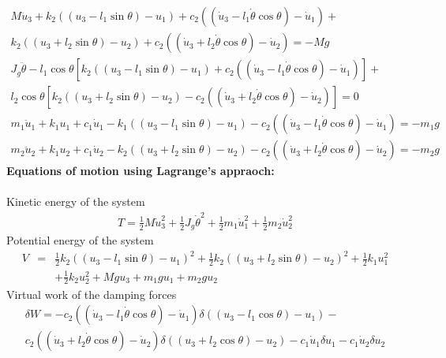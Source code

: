 \documentclass[]{report}
\begin{document}
\begin{eqnarray}
M \ddot{u}_3+k_2\left(\left(u_3-l_1 \sin{\theta}\right) -u_1\right)+c_2\left(\left(\dot{u}_3 -l_1 \dot{\theta} \cos{\theta}\right)-\dot{u}_1\right)+\nonumber\\
k_2\left(\left(u_3+l_2 \sin{\theta}\right) -u_2\right)+c_2\left(\left(\dot{u}_3 +l_2 \dot{\theta} \cos{\theta}\right)-\dot{u}_2\right)=-Mg\\
J_g \ddot{\theta}-l_1 \cos{\theta} \left[ k_2\left(\left(u_3-l_1 \sin{\theta}\right) -u_1\right)+c_2\left(\left(\dot{u}_3 -l_1 \dot{\theta} \cos{\theta}\right)-\dot{u}_1 \right) \right]+\nonumber\\
l_2 \cos{\theta} \left[k_2\left(\left(u_3+l_2 \sin{\theta}\right) -u_2\right)-c_2\left(\left(\dot{u}_3 +l_2 \dot{\theta} \cos{\theta}\right)-\dot{u}_2\right)\right]=0\\
 m_1 \ddot{u}_1+k_1 u_1 +c_1\dot{u}_1-k_1\left(\left(u_3-l_1\sin{\theta}\right)-u_1\right)-c_2\left(\left(\dot{u}_3 -l_1 \dot{\theta} \cos{\theta}\right)-\dot{u}_1 \right)=-m_1g\\
m_2 \ddot{u}_2+k_1 u_2 +c_1\dot{u}_2-k_2\left(\left(u_3+l_2\sin{\theta}\right)-u_2\right)-c_2\left(\left(\dot{u}_3 +l_2 \dot{\theta} \cos{\theta}\right)-\dot{u}_2 \right)=-m_2g
\end{eqnarray}
\textbf{Equations of motion using Lagrange's appraoch:}\\
\\
Kinetic energy of the system
\begin{eqnarray*}
T=\frac{1}{2}M\dot{u}_3^2+\frac{1}{2}J_g \dot{\theta}^2+\frac{1}{2}m_1 \dot{u}_1 ^2+\frac{1}{2}m_2 \dot{u}_2^2
\end{eqnarray*}
Potential energy of the system
\begin{eqnarray*}
V&=&\frac{1}{2}k_2 \left(\left(u_3-l_1\sin{\theta}\right)-u_1\right)^2+\frac{1}{2}k_2 \left(\left(u_3+l_2\sin{\theta}\right)-u_2\right)^2+\frac{1}{2}k_1 u_1^2\\ &&+\frac{1}{2}k_2u_2^2+Mgu_3+m_1gu_1+m_2gu_2
\end{eqnarray*}
Virtual work of the damping forces
\begin{eqnarray*}
\delta W =-c_2 \left(\left(\dot{u}_3-l_1 \dot{\theta}\cos{\theta}\right)-\dot{u}_1\right)\delta{\left(\left({u}_3-l_1 \cos{\theta}\right)-{u}_1\right)}-\\
c_2 \left(\left(\dot{u}_3+l_2 \dot{\theta}\cos{\theta}\right)-\dot{u}_2\right)\delta{\left(\left({u}_3+l_2 \cos{\theta}\right)-{u}_2\right)}
-c_1 \dot{u}_1\delta u_1 -c_1 \dot{u}_2 \delta u_2
\end{eqnarray*}
\end{document}
